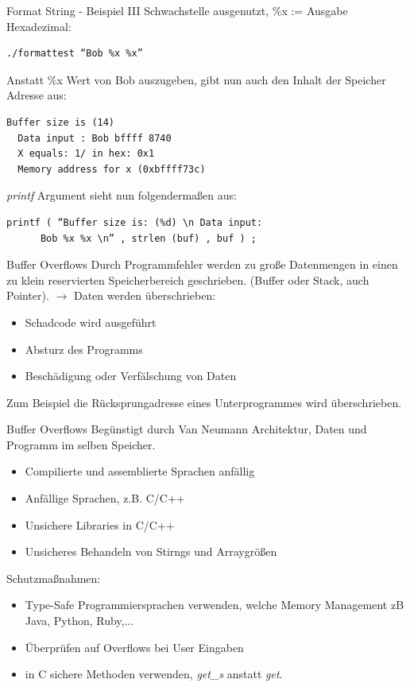\documentclass[10pt]{beamer}
\begin{document}
\begin{frame}[fragile]{Format String - Beispiel III}
  Schwachstelle ausgenutzt, \%x := Ausgabe Hexadezimal:
  \begin{lstlisting}[style=BashStyle]
  ./formattest “Bob %x %x”
  \end{lstlisting}
  Anstatt \%x Wert von Bob auszugeben, gibt nun auch den Inhalt der Speicher Adresse aus:
  \begin{lstlisting}[style=BashStyle]
  Buffer size is (14)
  Data input : Bob bffff 8740
  X equals: 1/ in hex: 0x1
  Memory address for x (0xbffff73c)
  \end{lstlisting}

  \textit{printf} Argument sieht nun folgenderma{\ss}en aus:
  \begin{lstlisting}[style=CStyle]
  printf ( “Buffer size is: (%d) \n Data input:
      Bob %x %x \n” , strlen (buf) , buf ) ;
  \end{lstlisting}
\end{frame}

\begin{frame}[fragile]{Buffer Overflows}
  Durch Programmfehler werden zu gro{\ss}e Datenmengen in einen zu klein reservierten Speicherbereich geschrieben.
  (Buffer oder Stack, auch Pointer).
  \newline
  \newline
  $\rightarrow$ Daten werden \"uberschrieben:
  \begin{itemize}
    \item Schadcode wird ausgef\"uhrt
    \item Absturz des Programms
    \item Besch\"adigung oder Verf\"alschung von Daten
  \end{itemize}
  Zum Beispiel die R\"ucksprungadresse eines Unterprogrammes wird \"uberschrieben.
\end{frame}

\begin{frame}[fragile]{Buffer Overflows}
  Beg\"unstigt durch Van Neumann Architektur, Daten und Programm im selben Speicher.
  \begin{itemize}
    \item Compilierte und assemblierte Sprachen anf\"allig
    \item Anf\"allige Sprachen, z.B. C/C++
    \item Unsichere Libraries in C/C++
    \item Unsicheres Behandeln von Stirngs und Arraygr\"o{\ss}en
  \end{itemize}
  Schutzma{\ss}nahmen:
  \begin{itemize}
    \item Type-Safe Programmiersprachen verwenden, welche Memory Management zB Java, Python, Ruby,...
    \item \"Uberpr\"ufen auf Overflows bei User Eingaben
    \item in C sichere Methoden verwenden, \textit{get\_s} anstatt \textit{get}.
  \end{itemize}
\end{frame}
\end{document}
